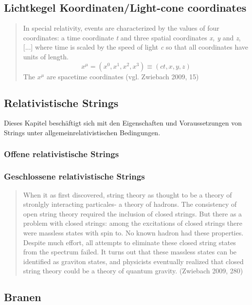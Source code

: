 \documentclass[a4paper,11pt]{article}
\begin{document}
\subsection{Lichtkegel Koordinaten/Light-cone coordinates}
\begin{quote}

In special relativity, events are characterized by the values of four coordinates: a time coordinate \textit{t} and three spatial coordinates \textit{x, y} and \textit{z}, [...] where time is scaled by the speed of light \textit{c} so that all coordinates have units of length. $$ x^ \mu = (x^0,x^1,x^2,x^3) \equiv (ct,x,y,z)$$
The $x^ \mu$ are spacetime coordinates (vgl. Zwiebach 2009, 15)
\end{quote}
\subsection{Relativistische Strings}

Dieses Kapitel beschäftigt sich mit den Eigenschaften und Voraussetzungen von Strings unter allgemeinrelativistischen Bedingungen.

\subsubsection{Offene relativistische Strings}

\subsubsection{Geschlossene relativistische Strings}

\begin{quote}
    When it as first discovered, string theory as thought to be a theory of stronlgly interacting particales- a theory of hadrons. The consistency of open string theory required the inclusion of closed strings. But there as a problem with closed strings: among the excitations of closed strings there were massless states with spin to. No known hadron had these properties. Despite much effort, all attempts to eliminate these closed string states from the spectrum failed. It turns out that these massless states can be identified as graviton states, and physicists eventually realized that closed string theory could be a theory of quantum gravity. (Zwiebach 2009, 280) 
\end{quote}

\subsection{Branen}
\end{document}
